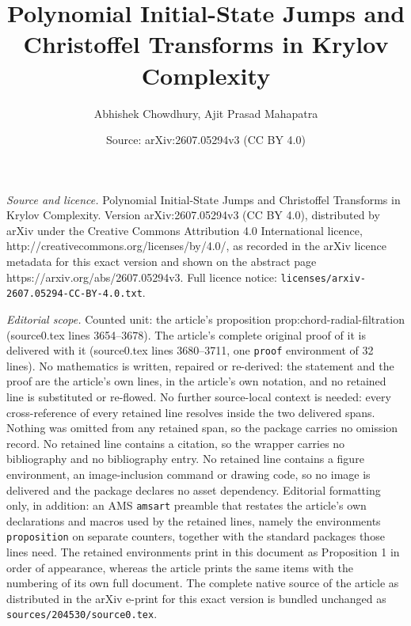 \documentclass[10pt,a4paper]{amsart}
\title{Polynomial Initial-State Jumps and Christoffel Transforms in Krylov Complexity}
\author{Abhishek Chowdhury, Ajit Prasad Mahapatra}
\date{Source: arXiv:2607.05294v3 (CC BY 4.0)}
\begin{document}
\maketitle

\noindent\emph{Source and licence.} Polynomial Initial-State Jumps and Christoffel Transforms in Krylov Complexity. Version arXiv:2607.05294v3 (CC BY 4.0), distributed by arXiv under the Creative Commons Attribution 4.0 International licence, http://creativecommons.org/licenses/by/4.0/, as recorded in the arXiv licence metadata for this exact version and shown on the abstract page https://arxiv.org/abs/2607.05294v3. Full licence notice: \texttt{licenses/arxiv-2607.05294-CC-BY-4.0.txt}.\par\smallskip

\noindent\textit{Editorial scope.} Counted unit: the article's proposition prop:chord-radial-filtration (source0.tex lines 3654--3678). The article's complete original proof of it is delivered with it (source0.tex lines 3680--3711, one \texttt{proof} environment of 32 lines). No mathematics is written, repaired or re-derived: the statement and the proof are the article's own lines, in the article's own notation, and no retained line is substituted or re-flowed.  No further source-local context is needed: every cross-reference of every retained line resolves inside the two delivered spans.  Nothing was omitted from any retained span, so the package carries no omission record.  No retained line contains a citation, so the wrapper carries no bibliography and no bibliography entry.  No retained line contains a figure environment, an image-inclusion command or drawing code, so no image is delivered and the package declares no asset dependency.  Editorial formatting only, in addition: an AMS \texttt{amsart} preamble that restates the article's own declarations and macros used by the retained lines, namely the environments \texttt{proposition} on separate counters, together with the standard packages those lines need.  The retained environments print in this document as Proposition 1 in order of appearance, whereas the article prints the same items with the numbering of its own full document.  The complete native source of the article as distributed in the arXiv e-print for this exact version is bundled unchanged as \texttt{sources/204530/source0.tex}.
\end{document}
